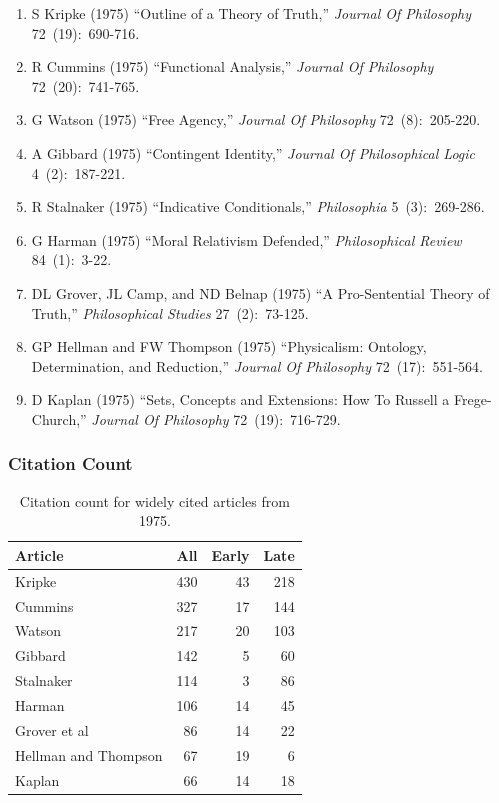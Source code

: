 \documentclass[
  10pt,
  letterpaper,
  DIV=11,
  numbers=noendperiod,
  twoside]{scrartcl}
\providecommand{\tightlist}{%
  \setlength{\itemsep}{0pt}\setlength{\parskip}{0pt}}\usepackage{longtable,booktabs,array}
\begin{document}
\begin{enumerate}
\def\labelenumi{\arabic{enumi}.}
\tightlist
\item
  S Kripke (1975) ``Outline of a Theory of Truth,'' \emph{Journal Of
  Philosophy} 72~(19):~690-716.
\item
  R Cummins (1975) ``Functional Analysis,'' \emph{Journal Of Philosophy}
  72~(20):~741-765.
\item
  G Watson (1975) ``Free Agency,'' \emph{Journal Of Philosophy}
  72~(8):~205-220.
\item
  A Gibbard (1975) ``Contingent Identity,'' \emph{Journal Of
  Philosophical Logic} 4~(2):~187-221.
\item
  R Stalnaker (1975) ``Indicative Conditionals,'' \emph{Philosophia}
  5~(3):~269-286.
\item
  G Harman (1975) ``Moral Relativism Defended,'' \emph{Philosophical
  Review} 84~(1):~3-22.
\item
  DL Grover, JL Camp, and ND Belnap (1975) ``A Pro-Sentential Theory of
  Truth,'' \emph{Philosophical Studies} 27~(2):~73-125.
\item
  GP Hellman and FW Thompson (1975) ``Physicalism: Ontology,
  Determination, and Reduction,'' \emph{Journal Of Philosophy}
  72~(17):~551-564.
\item
  D Kaplan (1975) ``Sets, Concepts and Extensions: How To Russell a
  Frege-Church,'' \emph{Journal Of Philosophy} 72~(19):~716-729.
\end{enumerate}

\subsubsection*{Citation Count}\label{sec-count-1975}

\begin{longtable}[]{@{}lrrr@{}}

\caption{\label{tbl-citation-count-1975}Citation count for widely cited
articles from 1975.}

\tabularnewline

\toprule\noalign{}
Article & All & Early & Late \\
\midrule\noalign{}
\endhead
\bottomrule\noalign{}
\endlastfoot
Kripke & 430 & 43 & 218 \\
Cummins & 327 & 17 & 144 \\
Watson & 217 & 20 & 103 \\
Gibbard & 142 & 5 & 60 \\
Stalnaker & 114 & 3 & 86 \\
Harman & 106 & 14 & 45 \\
Grover et al & 86 & 14 & 22 \\
Hellman and Thompson & 67 & 19 & 6 \\
Kaplan & 66 & 14 & 18 \\

\end{longtable}
\end{document}
